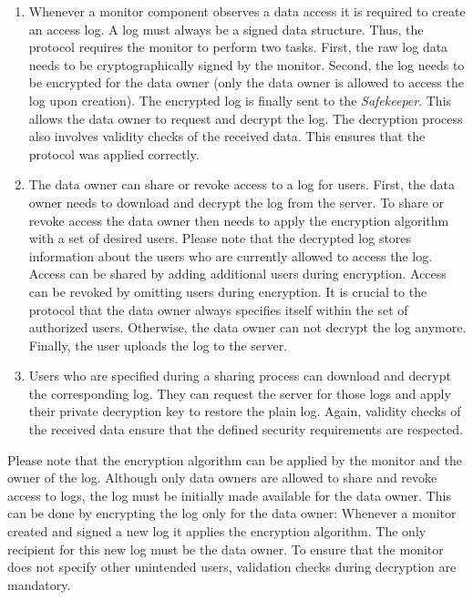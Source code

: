 \documentclass[../main.tex]{subfiles}
\begin{document}
\begin{enumerate}
    \item
    Whenever a monitor component observes a data access it is required to create an access log.
    A log must always be a signed data structure.
    Thus, the protocol requires the monitor to perform two tasks.
    First, the raw log data needs to be cryptographically signed by the monitor.
    Second, the log needs to be encrypted for the data owner (only the data owner is allowed to access the log upon creation).
    The encrypted log is finally sent to the \emph{Safekeeper}.
    This allows the data owner to request and decrypt the log.
    The decryption process also involves validity checks of the received data.
    This ensures that the protocol was applied correctly.
    \item 
    The data owner can share or revoke access to a log for users.
    First, the data owner needs to download and decrypt the log from the server.
    To share or revoke access the data owner then needs to apply the encryption algorithm with a set of desired users.
    Please note that the decrypted log stores information about the users who are currently allowed to access the log.
    Access can be shared by adding additional users during encryption.
    Access can be revoked by omitting users during encryption.
    It is crucial to the protocol that the data owner always specifies itself within the set of authorized users.
    Otherwise, the data owner can not decrypt the log anymore.
    Finally, the user uploads the log to the server.
    \item
    Users who are specified during a sharing process can download and decrypt the corresponding log.
    They can request the server for those logs and apply their private decryption key to restore the plain log.
    Again, validity checks of the received data ensure that the defined security requirements are respected.
    
\end{enumerate}

Please note that the encryption algorithm can be applied by the monitor and the owner of the log.
Although only data owners are allowed to share and revoke access to logs, the log must be initially made available for the data owner.
This can be done by encrypting the log only for the data owner:
Whenever a monitor created and signed a new log it applies the encryption algorithm.
The only recipient for this new log must be the data owner.
To ensure that the monitor does not specify other unintended users, validation checks during decryption are mandatory.
\end{document}
